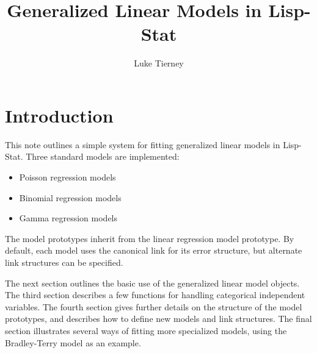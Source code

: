 
\newcommand{\refitem}[1]{%
  \begin{list}%
        {}%
        {\setlength{\leftmargin}{.25in}\setlength{\itemindent}{-.25in}}
  \item #1%
  \end{list}}

\setlength{\textwidth}{6in}
\setlength{\textheight}{8.75in}
\setlength{\topmargin}{-0.25in}
\setlength{\oddsidemargin}{0.25in}

\newcommand{\dcode}[1]{{\tt #1}}

\newcommand{\param}[1]{$\langle${\em #1\/}$\rangle$}
\newcommand{\protoimage}[1]{\begin{picture}(100,20)\put(0,0){\makebox(100,20){\tt #1}}\put(50,10){\oval(100,20)}\end{picture}}
\newcommand{\wprotoimage}[1]{\begin{picture}(120,20)\put(0,0){\makebox(120,20){\tt #1}}\put(60,10){\oval(120,20)}\end{picture}}

\title{Generalized Linear Models in Lisp-Stat}
\author{Luke Tierney}


\maketitle

\section{Introduction}
This note outlines a simple system for fitting generalized linear
models in Lisp-Stat. Three standard models are implemented:
\begin{itemize}
\item Poisson regression models
\item Binomial regression models
\item Gamma regression models
\end{itemize}
The model prototypes inherit from the linear regression model
prototype. By default, each model uses the canonical link for its
error structure, but alternate link structures can be specified.

The next section outlines the basic use of the generalized linear
model objects. The third section describes a few functions for
handling categorical independent variables. The fourth section gives
further details on the structure of the model prototypes, and
describes how to define new models and link structures. The final
section illustrates several ways of fitting more specialized models,
using the Bradley-Terry model as an example.

